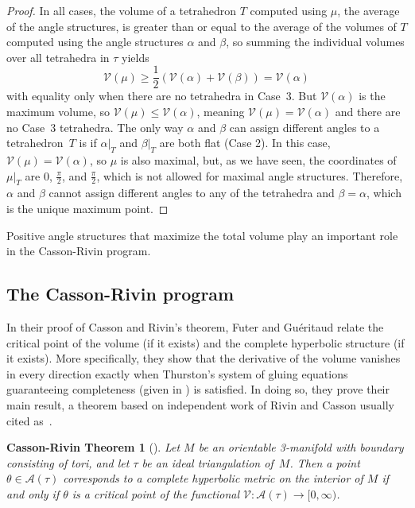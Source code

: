 \documentclass[reqno]{amsart}
\theoremstyle{plain}
\newtheorem*{CRtheorem}{Casson-Rivin Theorem}
\theoremstyle{definition}
\begin{document}
\begin{proof}
In all cases, the volume of a tetrahedron $T$ computed using $\mu$, the average of the angle structures, is greater than or equal to the average of the volumes of $T$ computed using the angle structures $\alpha$ and $\beta$, so summing the individual volumes over all tetrahedra in $\tau$ yields
$$
\mathcal{V}(\mu)\ge\textstyle{\frac12}(\mathcal{V}(\alpha)+\mathcal{V}(\beta))=\mathcal{V}(\alpha)
$$
with equality only when there are no tetrahedra in Case~3.  But $\mathcal{V}(\alpha)$ is the maximum volume, so $\mathcal{V}(\mu)\le\mathcal{V}(\alpha)$, meaning $\mathcal{V}(\mu)=\mathcal{V}(\alpha)$ and there are no Case~3 tetrahedra.  The
only way $\alpha$ and $\beta$ can assign different angles to a tetrahedron~$T$ is if $\alpha|_T$ and $\beta|_T$ are both flat (Case 2).  In this case,  $\mathcal{V}(\mu)=\mathcal{V}(\alpha)$, so $\mu$ is also maximal, but, as we have seen, the coordinates of $\mu|_T$ are $0$, $\frac\pi2$, and $\frac\pi2$, which is not allowed for maximal angle structures.  Therefore, $\alpha$ and $\beta$ cannot assign different angles to any of the tetrahedra and $\beta=\alpha$, which is the unique maximum point.
\end{proof}

Positive angle structures that maximize the total volume play an important role in the Casson-Rivin program.

\subsection{The Casson-Rivin program} \label{sec:CR}

In their proof of Casson and Rivin's theorem, Futer and Gu\'eritaud  relate  the critical point of the volume (if it exists) and the complete hyperbolic structure (if it exists).  More specifically, they show that the derivative of the volume vanishes in every direction exactly when Thurston's system of gluing equations guaranteeing completeness (given in \cite{Thurston1}) is satisfied.  In doing so, they prove their main result, a theorem based on independent work of Rivin and Casson usually cited as~\cite{Rivin}.

\begin{CRtheorem}[{\cite[Theorem 1.2]{AngledtoHyperbolic}}]  Let $M$ be an orientable 3-manifold with boundary consisting of tori, and let $\tau$ be an ideal triangulation of~$M$.  Then a point $\theta\in\mathcal A(\tau)$ corresponds to a complete hyperbolic metric on the interior of $M$ if and only if $\theta$ is a critical point of the functional $\mathcal V: \mathcal A(\tau)\rightarrow[0,\infty)$.
\end{CRtheorem}
\end{document}
